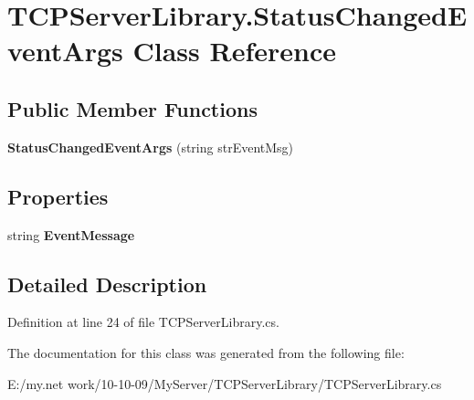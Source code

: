\hypertarget{class_t_c_p_server_library_1_1_status_changed_event_args}{
\section{TCPServerLibrary.StatusChangedEventArgs Class Reference}
\label{class_t_c_p_server_library_1_1_status_changed_event_args}
}
\subsection*{Public Member Functions}
\begin{DoxyCompactItemize}
\item 
\hypertarget{class_t_c_p_server_library_1_1_status_changed_event_args_ad146bf24d98b1c3d10204a774f61df7e}{
{\bfseries StatusChangedEventArgs} (string strEventMsg)}
\label{class_t_c_p_server_library_1_1_status_changed_event_args_ad146bf24d98b1c3d10204a774f61df7e}

\end{DoxyCompactItemize}
\subsection*{Properties}
\begin{DoxyCompactItemize}
\item 
\hypertarget{class_t_c_p_server_library_1_1_status_changed_event_args_a2c7aafa4086078155760142fbfbc79f5}{
string {\bfseries EventMessage}}
\label{class_t_c_p_server_library_1_1_status_changed_event_args_a2c7aafa4086078155760142fbfbc79f5}

\end{DoxyCompactItemize}


\subsection{Detailed Description}


Definition at line 24 of file TCPServerLibrary.cs.

The documentation for this class was generated from the following file:\begin{DoxyCompactItemize}
\item 
E:/my.net work/10-\/10-\/09/MyServer/TCPServerLibrary/TCPServerLibrary.cs\end{DoxyCompactItemize}
